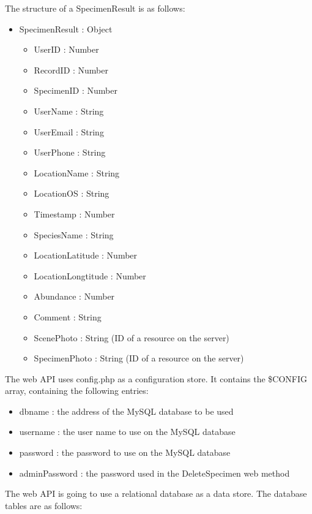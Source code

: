         The structure of a SpecimenResult is as follows:
        \begin{itemize}
        	\item SpecimenResult : Object
        	\begin{itemize}
	        	\item UserID : Number
	        	\item RecordID : Number
	        	\item SpecimenID : Number
        		\item UserName : String
        		\item UserEmail : String
        		\item UserPhone : String
        		\item LocationName : String
        		\item LocationOS : String
        		\item Timestamp : Number
        		\item SpeciesName : String
        		\item LocationLatitude : Number
        		\item LocationLongtitude : Number
        		\item Abundance : Number
        		\item Comment : String
        		\item ScenePhoto : String (ID of a resource on the server)
        		\item SpecimenPhoto : String (ID of a resource on the server)
        	\end{itemize}
        \end{itemize}

		The web API uses config.php as a configuration store. It contains the \$CONFIG array, containing the following entries:
		
		 \begin{itemize}
			 	\item dbname : the address of the MySQL database to be used
			 	\item username : the user name to use on the MySQL database
			 	\item password : the password to use on the MySQL database
			 	\item adminPassword : the password used in the DeleteSpecimen web method
		\end{itemize}
        The web API is going to use a relational database as a data store.
        The database tables are as follows:

